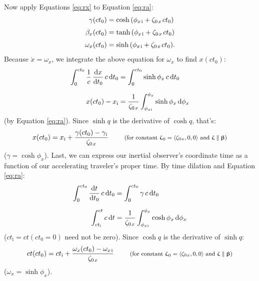 \documentclass[12pt]{article}
\newcommand{\dd}[1]{\mathrm{d}#1}
\newcommand{\vvbeta}{\bm{\upbeta}}
\newcommand{\vvzeta}{\bm{\upzeta}}
\begin{document}
Now apply Equations \ref{eq:rx} to Equation \ref{eq:ra}:
\begin{equation*}
\begin{aligned}
\gamma (ct_0) &= \cosh{\left( \phi_{x \mkern2mu \textrm{i} } + \zeta_{0 \mkern2mu x} \mkern2mu ct_0 \right)} \\[3pt]
\beta_x (ct_0) &= \tanh{\left( \phi_{x \mkern2mu \textrm{i} } + \zeta_{0 \mkern2mu x} \mkern2mu ct_0 \right)} \\[3pt]
\omega_x (ct_0) &= \sinh{\left( \phi_{x \mkern2mu \textrm{i} } + \zeta_{0 \mkern2mu x} \mkern2mu ct_0 \right)} .
\end{aligned}
\end{equation*}
Because $\mathring{x} = \omega_x$, we integrate the above equation for $\omega_x$ to find $x(ct_0)$:
\begin{equation*}
\begin{split}
\int^{ct_0}_0 \dfrac{1}{c} \, \dfrac{\dd x}{\dd t_0} \, c \, \dd t_0 &= \int^{ct_0}_0 \sinh{\phi_x} \, c \, \dd t_0 \\[6pt]
x(ct_0) - x_{\mathrm{i}} &= \dfrac{1}{\zeta_{0 \mkern2mu x}} \int^{\phi_x}_{\phi_{x \mkern1mu \textrm{i} }} \sinh{\phi_x} \, \dd \phi_x
\end{split}
\end{equation*}
(by Equation \ref{eq:ra}). Since $\sinh{q}$ is the derivative of $\cosh{q}$, that's:
\begin{equation}\label{eq:x2}
x(ct_0) = x_{\mathrm{i}} + \dfrac{\gamma(ct_0) - \gamma_{\mkern1mu \mathrm{i}}}{ \zeta_{0 \mkern2mu x}} \qquad \textrm{\footnotesize{ (for constant $\vvzeta_{\mkern1mu 0} = \langle \zeta_{0 \mkern1mu x} , 0, 0 \rangle$ and $\vvzeta \parallel \vvbeta$)}}
\end{equation}
($\gamma = \cosh{\phi_x}$). Last, we can express our inertial observer's coordinate time as a function of our accelerating traveler's proper time. By time dilation and Equation \ref{eq:ra}:
\begin{equation*}
\begin{split}
\int^{ct_0}_0 \dfrac{\dd t}{\dd t_0} \, c \, \dd t_0 &= \int^{ct_0}_0 \gamma \, c \, \dd t_0 \\[6pt]
\int^{ct}_{ct_{\mathrm{i}}} c \, \dd t &= \dfrac{1}{ \zeta_{0 \mkern2mu x}} \int^{\phi_x}_{\phi_{x \mkern1mu \textrm{i} }} \cosh{\phi_x} \, \dd \phi_x
\end{split}
\end{equation*}
($ct_{\mathrm{i}} = ct (ct_0 = 0)$ need not be zero). Since $\cosh q$ is the derivative of $\sinh q$:
\begin{equation}\label{eq:ct}
ct(ct_0) = ct_{\mathrm{i}} + \dfrac{\omega_x (ct_0) - \omega_{x \mkern2mu \textrm{i} }}{ \zeta_{0 \mkern2mu x}} \qquad \textrm{\footnotesize{ (for constant $\vvzeta_{\mkern1mu 0} = \langle \zeta_{0 \mkern1mu x} , 0, 0 \rangle$ and $\vvzeta \parallel \vvbeta$)}}
\end{equation}
($\omega_x = \sinh{\phi_x}$).
\end{document}
